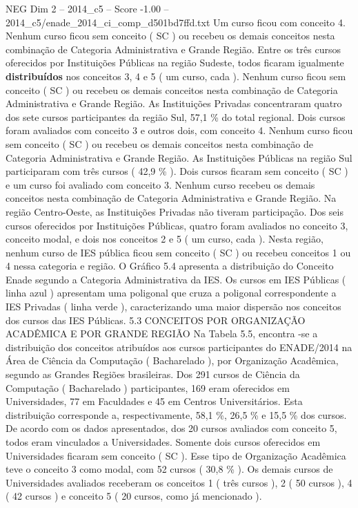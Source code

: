 \begin{textsample}{NEG Dim 2 – 2014\_c5 – Score -1.00 – 2014\_c5/enade\_2014\_ci\_comp\_d501bd7ffd.txt}
Um curso ficou com conceito 4.
Nenhum curso ficou sem conceito ( SC ) ou recebeu os demais conceitos nesta combinação de Categoria Administrativa e Grande Região.
Entre os três cursos oferecidos por Instituições Públicas na região Sudeste, todos ficaram igualmente \textbf{distribuídos} nos conceitos 3, 4 e 5 ( um curso, cada ).
Nenhum curso ficou sem conceito ( SC ) ou recebeu os demais conceitos nesta combinação de Categoria Administrativa e Grande Região.
As Instituições Privadas concentraram quatro dos sete cursos participantes da região Sul, 57,1 \% do total regional.
Dois cursos foram avaliados com conceito 3 e outros dois, com conceito 4.
Nenhum curso ficou sem conceito ( SC ) ou recebeu os demais conceitos nesta combinação de Categoria Administrativa e Grande Região.
As Instituições Públicas na região Sul participaram com três cursos ( 42,9 \% ).
Dois cursos ficaram sem conceito ( SC ) e um curso foi avaliado com conceito 3.
Nenhum curso recebeu os demais conceitos nesta combinação de Categoria Administrativa e Grande Região.
Na região Centro-Oeste, as Instituições Privadas não tiveram participação.
Dos seis cursos oferecidos por Instituições Públicas, quatro foram avaliados no conceito 3, conceito modal, e dois nos conceitos 2 e 5 ( um curso, cada ).
Nesta região, nenhum curso de IES pública ficou sem conceito ( SC ) ou recebeu conceitos 1 ou 4 nessa categoria e região.
O Gráfico 5.4 apresenta a distribuição do Conceito Enade segundo a Categoria Administrativa da IES.
Os cursos em IES Públicas ( linha azul ) apresentam uma poligonal que cruza a poligonal correspondente a IES Privadas ( linha verde ), caracterizando uma maior dispersão nos conceitos dos cursos das IES Públicas. 5.3 CONCEITOS POR ORGANIZAÇÃO ACADÊMICA E POR GRANDE REGIÃO Na Tabela 5.5, encontra -se a distribuição dos conceitos atribuídos aos cursos participantes do ENADE/2014 na Área de Ciência da Computação ( Bacharelado ), por Organização Acadêmica, segundo as Grandes Regiões brasileiras.
Dos 291 cursos de Ciência da Computação ( Bacharelado ) participantes, 169 eram oferecidos em Universidades, 77 em Faculdades e 45 em Centros Universitários.
Esta distribuição corresponde a, respectivamente, 58,1 \%, 26,5 \% e 15,5 \% dos cursos.
De acordo com os dados apresentados, dos 20 cursos avaliados com conceito 5, todos eram vinculados a Universidades.
Somente dois cursos oferecidos em Universidades ficaram sem conceito ( SC ).
Esse tipo de Organização Acadêmica teve o conceito 3 como modal, com 52 cursos ( 30,8 \% ).
Os demais cursos de Universidades avaliados receberam os conceitos 1 ( três cursos ), 2 ( 50 cursos ), 4 ( 42 cursos ) e conceito 5 ( 20 cursos, como já mencionado ).

\end{textsample}

